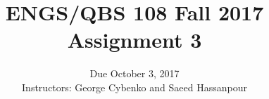 \documentclass[12pt]{article}
\begin{document}
 


\title{ENGS/QBS 108 Fall 2017 Assignment 3}
\author{Due October 3, 2017 \\ Instructors: George Cybenko and Saeed Hassanpour}
\date{}
\maketitle

\pagebreak

\end{document}
